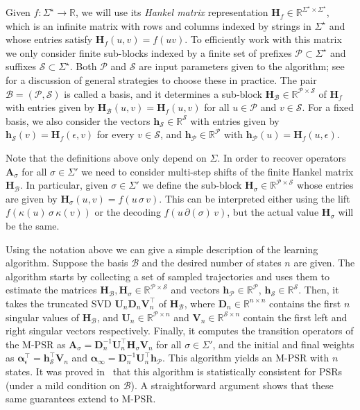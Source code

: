 \documentclass[letterpaper]{article}
\newcommand{\mat}[1]{\mathbf{#1}}
\newcommand{\A}{\mat{A}}
\renewcommand{\H}{\mat{H}}
\newcommand{\Rset}{\mathbb{R}}
\newcommand{\R}{\Rset}
\newcommand{\sstar}{\Sigma^\star}
\newcommand{\aone}{\boldsymbol{\alpha}_\epsilon}
\newcommand{\ainf}{\boldsymbol{\alpha}_{\infty}}
\newcommand{\Bs}{\mathcal{B}}
\newcommand{\Ps}{\mathcal{P}}
\newcommand{\Ss}{\mathcal{S}}
\begin{document}
Given $f : \sstar \to \R$, we will use its \emph{Hankel matrix} representation $\H_f \in \R^{\sstar \times \sstar}$, which is an infinite matrix with rows and columns indexed by strings in $\sstar$ and whose entries satisfy $\H_f(u,v) = f(u v)$. To efficiently work with this matrix we only consider finite sub-blocks indexed by a finite set of prefixes $\Ps \subset \sstar$ and suffixes $\Ss \subset \sstar$. Both $\Ps$ and $\Ss$ are input parameters given to the algorithm; see \cite{icml12} for a discussion of general strategies to choose these in practice. The pair $\Bs = (\Ps,\Ss)$ is called a basis, and it determines a sub-block $\H_\Bs \in \R^{\Ps \times \Ss}$ of $\H_f$ with entries given by $\H_\Bs(u,v) = \H_f(u,v)$ for all $u \in \Ps$ and $v \in \Ss$. For a fixed basis, we also consider the vectors $\mat{h}_{\Ss} \in \R^{\Ss}$ with entries given by $\mat{h}_{\Ss}(v) = \H_f(\epsilon,v)$ for every $v \in \Ss$, and $\mat{h}_{\Ps} \in \R^{\Ps}$ with $\mat{h}_{\Ps}(u) = \H_f(u,\epsilon)$.

Note that the definitions above only depend on $\Sigma$. In order to recover operators $\A_\sigma$ for all $\sigma \in \Sigma'$ we need to consider multi-step shifts of the finite Hankel matrix $\H_{\Bs}$. In particular, given $\sigma \in \Sigma'$ we define the sub-block $\H_\sigma \in \R^{\Ps \times \Ss}$ whose entries are given by $\H_\sigma(u,v) = f(u \, \sigma \, v)$. This can be interpreted either using the lift $f(\kappa(u) \, \sigma \, \kappa(v))$ or the decoding $f(u \, \partial(\sigma) \, v)$, but the actual value $\H_\sigma$ will be the same.

Using the notation above we can give a simple description of the learning algorithm. Suppose the basis $\Bs$ and the desired number of states $n$ are given. The algorithm starts by collecting a set of sampled trajectories and uses them to estimate the matrices $\H_{\Bs}, \H_\sigma \in \R^{\Ps \times \Ss}$ and vectors $\mat{h}_{\Ps} \in \R^{\Ps}$, $\mat{h}_{\Ss} \in \R^{\Ss}$. Then, it takes the truncated SVD $\mat{U}_n \mat{D}_n \mat{V}_n^\top$ of $\H_{\Bs}$, where $\mat{D}_n \in \R^{n \times n}$ contains the first $n$ singular values of $\H_{\Bs}$, and $\mat{U}_n \in \R^{\Ps \times n}$ and $\mat{V}_n \in \R^{\Ss \times n}$ contain the first left and right singular vectors respectively. Finally, it computes the transition operators of the M-PSR as $\A_\sigma = \mat{D}_n^{-1} \mat{U}_n^\top \H_\sigma \mat{V}_n$ for all $\sigma \in \Sigma'$, and the initial and final weights as $\aone^\top = \mat{h}_{\Ss}^\top \mat{V}_n$ and $\ainf = \mat{D}_n^{-1} \mat{U}_n^\top \mat{h}_{\Ps}$.
%
This algorithm yields an M-PSR with $n$ states. It was proved in~\cite{bootspsr} that this algorithm is statistically consistent for PSRs (under a mild condition on $\Bs$). A straightforward argument shows that these same guarantees extend to M-PSR.
\end{document}
